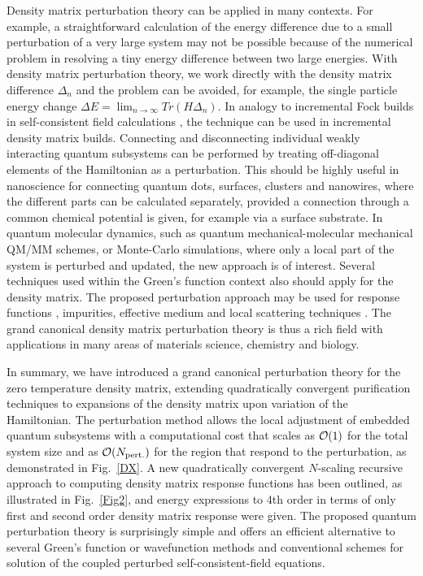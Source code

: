 Density matrix perturbation theory can be applied in many contexts. 
For example, a straightforward calculation of the energy difference 
due to a small perturbation of a very large system may not be possible because
of the numerical problem in resolving a tiny energy difference between
two large energies. With density matrix perturbation theory, 
we work directly with the density matrix difference $\Delta_n$ and the
problem can be avoided, for example, the single particle energy change
$\Delta E = \lim_{n \rightarrow \infty} Tr(H\Delta_n)$. In analogy to incremental Fock builds
in self-consistent field calculations \cite{Schwengler97}, the technique 
can be used in incremental density matrix builds.
Connecting and disconnecting individual weakly interacting 
quantum subsystems can be performed by treating off-diagonal elements of the
Hamiltonian as a perturbation. This should be highly useful in nanoscience 
for connecting quantum dots, surfaces, clusters and nanowires, where the different 
parts can be calculated separately, provided a connection through a common
chemical potential is given, for example via a surface substrate.
In quantum molecular dynamics, such as quantum mechanical-molecular mechanical QM/MM 
schemes, or Monte-Carlo simulations, where only a local part of the system is perturbed 
and updated, the new approach is of interest. 
Several techniques used within the Green's function context also should 
apply for the density matrix. The proposed perturbation approach may 
be used for response functions \cite{Weber04}, impurities, 
effective medium and local scattering techniques \cite{Haydock80,Inglesfield81,Turek,Igor}.  
The grand canonical density matrix perturbation theory is thus a rich field
with applications in many areas of materials science, chemistry and biology.

In summary, we have introduced a grand canonical perturbation theory 
for the zero temperature density matrix, extending quadratically convergent 
purification techniques to expansions of the density matrix upon variation
of the Hamiltonian.  The perturbation method allows the local adjustment of 
embedded quantum subsystems with a computational cost that scales as ${\cal O}(1)$
for the total system size and as ${\cal O}(N_{\rm pert.})$ for the 
region that respond to the perturbation, as demonstrated in Fig.~\ref{DX}.
A new quadratically convergent $N$-scaling recursive approach to computing 
density matrix response functions has been outlined, as illustrated
in Fig.\ \ref{Fig2}, and energy 
expressions to 4th order in terms of only first and second order density matrix 
response were given.  The proposed quantum perturbation theory is surprisingly 
simple and offers an efficient alternative to several Green's function 
or wavefunction methods and conventional schemes for solution of the coupled 
perturbed self-consistent-field equations.

